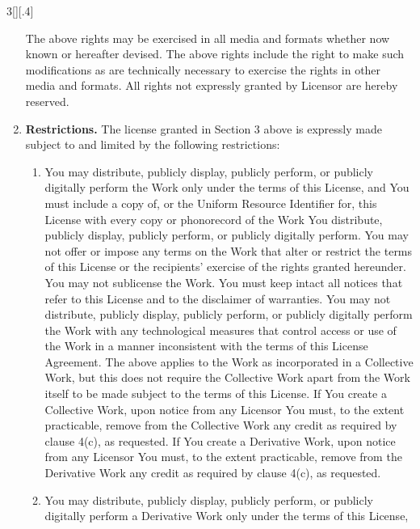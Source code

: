 \documentclass[8pt,a4paper]{article}
\begin{document}
\begin{multicols}{3}[][.4\paperwidth]
\begin{enumerate}
\begin{enumerate}
  \end{enumerate}


  The above rights may be exercised in all media and formats whether now known or
  hereafter devised. The above rights include the right to make such
  modifications as are technically necessary to exercise the rights in other
  media and formats. All rights not expressly granted by Licensor are hereby
  reserved.

  \item \textbf{Restrictions.} The license granted in Section 3 above is expressly
        made subject to and limited by the following restrictions:

  \begin{enumerate}

  \item You may distribute, publicly display, publicly perform, or publicly
        digitally perform the Work only under the terms of this License, and You
        must include a copy of, or the Uniform Resource Identifier for, this
        License with every copy or phonorecord of the Work You distribute,
        publicly display, publicly perform, or publicly digitally perform. You
        may not offer or impose any terms on the Work that alter or restrict the
        terms of this License or the recipients' exercise of the rights granted
        hereunder. You may not sublicense the Work. You must keep intact all
        notices that refer to this License and to the disclaimer of warranties.
        You may not distribute, publicly display, publicly perform, or publicly
        digitally perform the Work with any technological measures that control
        access or use of the Work in a manner inconsistent with the terms of this
        License Agreement. The above applies to the Work as incorporated in a
        Collective Work, but this does not require the Collective Work apart from
        the Work itself to be made subject to the terms of this License. If You
        create a Collective Work, upon notice from any Licensor You must, to the
        extent practicable, remove from the Collective Work any credit as
        required by clause 4(c), as requested. If You create a Derivative Work,
        upon notice from any Licensor You must, to the extent practicable, remove
        from the Derivative Work any credit as required by clause 4(c), as
        requested.
  \item You may distribute, publicly display, publicly perform, or publicly
        digitally perform a Derivative Work only under the terms of this License,

\end{enumerate}
\end{enumerate}
\end{multicols}
\end{document}
